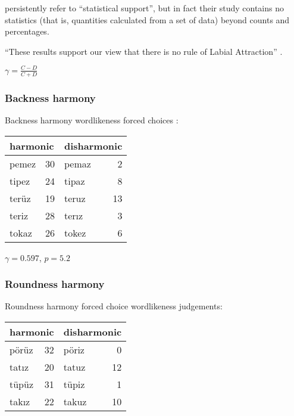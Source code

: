\noindent \citeauthor{Inkelas2001} persistently refer to ``statistical support'', but in fact their study contains no statistics (that is, quantities calculated from a set of data) beyond counts and percentages. 



``These results support our view that there is no rule of Labial Attraction'' \citep[][225]{Clements1982}.


\citet{Goodman1954}

\begin{example}
$\displaystyle \gamma = \frac{C - D}{C + D}$
\end{example}

\subsubsection{Backness harmony}


\begin{example}
Backness harmony wordlikeness forced choices \citep[314]{Zimmer1969}: 

\vspace{0.5\baselineskip}
\begin{tabular}{l r l r}
\toprule
\multicolumn{2}{l}{harmonic} & \multicolumn{2}{l}{disharmonic} \\
\midrule
pemez & 30                   & pemaz & 2  \\
tipez & 24                   & tipaz & 8  \\ 
terüz & 19                   & teruz & 13 \\ %
teriz & 28                   & terız & 3  \\
tokaz & 26                   & tokez & 6  \\ %
\bottomrule
\end{tabular}
\end{example}

$\gamma = 0.597$, $p = 5.2$

\subsubsection{Roundness harmony}

\begin{example}
Roundness harmony forced choice wordlikeness judgements: 

\vspace{0.5\baselineskip}
\begin{tabular}{l r l r}
\toprule
\multicolumn{2}{l}{harmonic} & \multicolumn{2}{l}{disharmonic} \\
\midrule
pörüz & 32 & pöriz & 0  \\
tatız & 20 & tatuz & 12 \\
tüpüz & 31 & tüpiz & 1  \\
takız & 22 & takuz & 10 \\
\bottomrule
\end{tabular}
\end{example}

